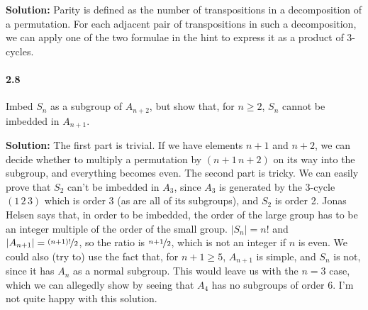 \documentclass[12pt,a4paper]{article}
\providecommand{\abs}[1]{\left \vert #1 \right \vert}
\providecommand{\soln}{\textbf{Solution: }}
\providecommand{\JH}{Jonas Helsen\xspace}
\begin{document}
\soln Parity is defined as the number of transpositions in a decomposition of a permutation.
For each adjacent pair of transpositions in such a decomposition, we can apply one of the two formulae in the hint to express it as a product of 3-cycles.

\paragraph*{2.8}
Imbed $S_n$ as a subgroup of $A_{n+2}$, but show that, for $n \geq 2$, $S_n$ cannot be imbedded in $A_{n+1}$.

\soln The first part is trivial. 
If we have elements $n + 1$ and $n + 2$, we can decide whether to multiply a permutation by $(n + 1 \, n + 2)$ on its way into the subgroup, and everything becomes even. 
The second part is tricky. 
We can easily prove that $S_2$ can't be imbedded in $A_{3}$, since $A_3$ is generated by the 3-cycle $(1\,2\,3)$ which is order 3 (as are all of its subgroups), and $S_2$ is order 2.
\JH says that, in order to be imbedded, the order of the large group has to be an integer multiple of the order of the small group. 
$\abs{S_n} = n!$ and $\abs{A_{n + 1}} = \nicefrac{(n + 1)!}{2}$, so the ratio is $\nicefrac{n+1}{2}$, which is not an integer if $n$ is even. 
We could also (try to) use the fact that, for $n + 1 \geq 5$, $A_{n + 1}$ is simple, and $S_n$ is not, since it has $A_n$ as a normal subgroup.
This would leave us with the $n=3$ case, which we can allegedly show by seeing that $A_4$ has no subgroups of order 6.
I'm not quite happy with this solution.
\end{document}
